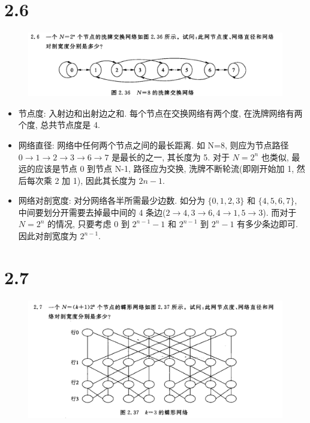 \documentclass[UTF8]{article}
\begin{document}
\section*{2.6}
\begin{center}
	\begin{figure}[H]
		\centering
		\includegraphics[width=\linewidth]{image/2.6.png}
	\end{figure}
\end{center}

\begin{itemize}
	\item 节点度: 入射边和出射边之和. 每个节点在交换网络有两个度, 在洗牌网络有两个度, 总共节点度是 4.
	\item 网络直径: 网络中任何两个节点之间的最长距离. 如 N=8, 则应为节点路径 $0\rightarrow 1\rightarrow 2\rightarrow 3 \rightarrow 6 \rightarrow 7$ 是最长的之一, 其长度为 5. 对于 $N=2^n$ 也类似, 最远的应该是节点 0 到节点 N-1, 路径应为交换, 洗牌不断轮流(即刚开始加 1, 然后每次乘 2 加 1), 因此其长度为 $2n-1$.
	\item 网络对剖宽度: 对分网络各半所需最少边数. 如分为 $\{0,1,2,3\}$ 和 $\{4,5,6,7\}$, 中间要划分开需要去掉最中间的 4 条边($2\rightarrow4, 3\rightarrow6,4\rightarrow1,5\rightarrow3$). 而对于 $N=2^n$ 的情况, 只要考虑 $0$ 到 $2^{n-1}-1$ 和 $2^{n-1}$ 到 $2^{n}-1$ 有多少条边即可. 因此对剖宽度为 $2^{n-1}$.
\end{itemize}

\section*{2.7}
\begin{center}
\begin{figure}[H]
	\centering
	\includegraphics[width=\linewidth]{image/2.7.png}
\end{figure}
\end{center}
\end{document}
